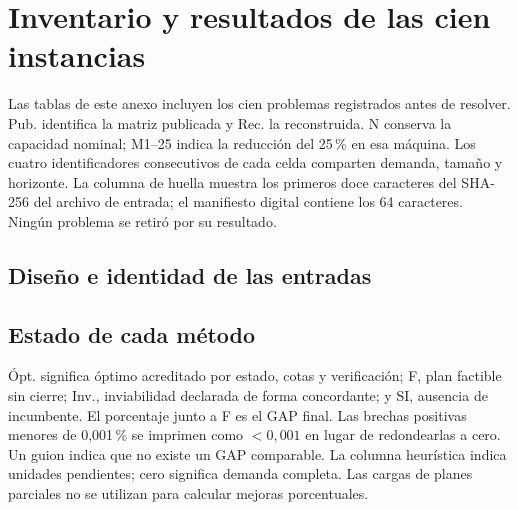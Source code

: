 \clearpage
\section{Inventario y resultados de las cien instancias}\label{an:instancias100}
Las tablas de este anexo incluyen los cien problemas registrados antes de resolver. Pub. identifica la matriz publicada y Rec. la reconstruida. N conserva la capacidad nominal; M1--25 indica la reducción del 25\,\% en esa máquina. Los cuatro identificadores consecutivos de cada celda comparten demanda, tamaño y horizonte. La columna de huella muestra los primeros doce caracteres del SHA-256 del archivo de entrada; el manifiesto digital contiene los 64 caracteres. Ningún problema se retiró por su resultado.

\subsection{Diseño e identidad de las entradas}
{\footnotesize\setlength{\tabcolsep}{4pt}

}

\subsection{Estado de cada método}
Ópt. significa óptimo acreditado por estado, cotas y verificación; F, plan factible sin cierre; Inv., inviabilidad declarada de forma concordante; y SI, ausencia de incumbente. El porcentaje junto a F es el GAP final. Las brechas positivas menores de 0,001\,\% se imprimen como $<0,001$ en lugar de redondearlas a cero. Un guion indica que no existe un GAP comparable. La columna heurística indica unidades pendientes; cero significa demanda completa. Las cargas de planes parciales no se utilizan para calcular mejoras porcentuales.
{\footnotesize\setlength{\tabcolsep}{5pt}

}

